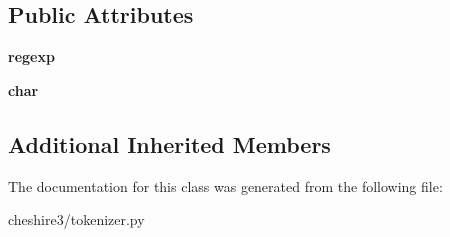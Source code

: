 \subsection*{Public Attributes}
\begin{DoxyCompactItemize}
\item 
\hypertarget{classcheshire3_1_1tokenizer_1_1_regexp_sub_tokenizer_a2494f81abe2403c982fe51f6312df20a}{{\bfseries regexp}}\label{classcheshire3_1_1tokenizer_1_1_regexp_sub_tokenizer_a2494f81abe2403c982fe51f6312df20a}

\item 
\hypertarget{classcheshire3_1_1tokenizer_1_1_regexp_sub_tokenizer_a23a57d5de48d3d4a0c49aa873369c96f}{{\bfseries char}}\label{classcheshire3_1_1tokenizer_1_1_regexp_sub_tokenizer_a23a57d5de48d3d4a0c49aa873369c96f}

\end{DoxyCompactItemize}
\subsection*{Additional Inherited Members}


The documentation for this class was generated from the following file\-:\begin{DoxyCompactItemize}
\item 
cheshire3/tokenizer.\-py\end{DoxyCompactItemize}

